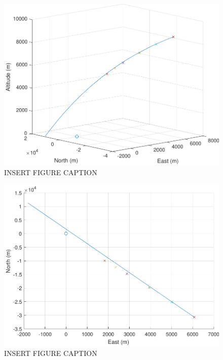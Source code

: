 \begin{figure}[H]
	\centering
	\begin{minipage}{4.5 in}
		\includegraphics[width=\linewidth]{Figures/trajunpowatmo_1.pdf}
		\caption{INSERT FIGURE CAPTION \label{fig:trajunpowatmo_1} }
	\end{minipage}
\end{figure}



\begin{figure}[H]
	\centering
	\begin{minipage}{4.5 in}
		\includegraphics[width=\linewidth]{Figures/trajunpowatmo_2.pdf}
		\caption{INSERT FIGURE CAPTION \label{fig:trajunpowatmo_2} }
	\end{minipage}
\end{figure}



